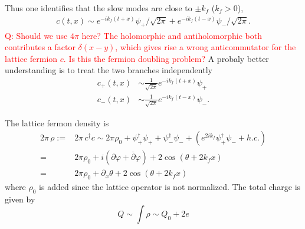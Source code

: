 \documentclass[submission, PhysLectNotes]{SciPost}
\begin{document}
Thus one identifies that the slow modes are close to $\pm k_f$ ($k_f > 0$),
\begin{equation}
	\begin{aligned}
		c\left(t,x\right) \sim e^{-ik_f \left( t+x \right)} \psi_{+}/\sqrt{2\pi} + e^{-ik_f\left(t-x\right)} \psi_{-}/\sqrt{2\pi}.
	\end{aligned}
\end{equation} 
\textcolor{red}{Q: Should we use $4\pi$ here? The holomorphic and antiholomorphic both contributes a factor $\delta(x-y)$, which gives rise a wrong anticommutator for the lattice fermion $c$. Is this the fermion doubling problem?} A probaly better understanding is to treat the two branches independently
\begin{equation}
	\begin{aligned}
		c_{+}\left(t,x\right) &\sim \frac{1}{\sqrt{2\pi}}e^{-ik_f \left( t+x \right)} \psi_{+}\\
		c_{-}\left(t,x\right) &\sim \frac{1}{\sqrt{2\pi}}e^{-ik_f\left(t-x\right)} \psi_{-}.
	\end{aligned}
\end{equation}


The lattice fermon density is 
\begin{equation}
	\begin{aligned}
		2\pi\,\rho :=& 2\pi\,c^\dagger c \sim 2\pi \rho_0 + \psi_{+}^\dagger \psi_{+} + \psi_{-}^\dagger \psi_{-} + \left(e^{2i k_f}\psi_{+}^\dagger \psi_{-} + h.c. \right) \\
		=&  2\pi \rho_0 +  i \left(\partial \varphi + \overline{\partial} \varphi\right) + 2 \cos (\theta + 2k_f x) \\
		=& 2\pi \rho_0 +  \partial_x \theta + 2 \cos (\theta + 2k_f x)
	\end{aligned}
\end{equation}
where $\rho_0$ is added since the lattice operator is not normalized. The total charge is given by 
\begin{equation}
	Q \sim \int \rho \sim Q_0 + 2e
\end{equation}
\\
\end{document}
